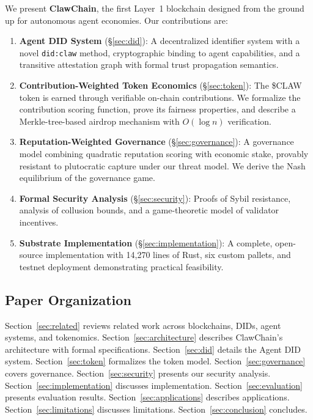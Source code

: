 \documentclass{article}
\begin{document}
We present \textbf{ClawChain}, the first Layer~1 blockchain designed from the ground up for autonomous agent economies. Our contributions are:

\begin{enumerate}
    \item \textbf{Agent DID System} (\S\ref{sec:did}): A decentralized identifier system with a novel \texttt{did:claw} method, cryptographic binding to agent capabilities, and a transitive attestation graph with formal trust propagation semantics.
    
    \item \textbf{Contribution-Weighted Token Economics} (\S\ref{sec:token}): The \$CLAW token is earned through verifiable on-chain contributions. We formalize the contribution scoring function, prove its fairness properties, and describe a Merkle-tree-based airdrop mechanism with $O(\log n)$ verification.
    
    \item \textbf{Reputation-Weighted Governance} (\S\ref{sec:governance}): A governance model combining quadratic reputation scoring with economic stake, provably resistant to plutocratic capture under our threat model. We derive the Nash equilibrium of the governance game.
    
    \item \textbf{Formal Security Analysis} (\S\ref{sec:security}): Proofs of Sybil resistance, analysis of collusion bounds, and a game-theoretic model of validator incentives.
    
    \item \textbf{Substrate Implementation} (\S\ref{sec:implementation}): A complete, open-source implementation with 14,270 lines of Rust, six custom pallets, and testnet deployment demonstrating practical feasibility.
\end{enumerate}

\subsection{Paper Organization}

Section~\ref{sec:related} reviews related work across blockchains, DIDs, agent systems, and tokenomics. Section~\ref{sec:architecture} describes ClawChain's architecture with formal specifications. Section~\ref{sec:did} details the Agent DID system. Section~\ref{sec:token} formalizes the token model. Section~\ref{sec:governance} covers governance. Section~\ref{sec:security} presents our security analysis. Section~\ref{sec:implementation} discusses implementation. Section~\ref{sec:evaluation} presents evaluation results. Section~\ref{sec:applications} describes applications. Section~\ref{sec:limitations} discusses limitations. Section~\ref{sec:conclusion} concludes.
\end{document}
